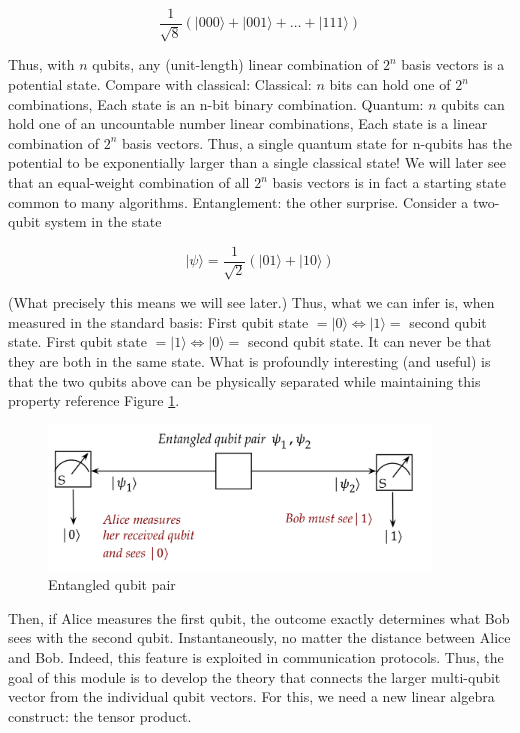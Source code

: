 \documentclass[main.tex]{subfiles}
\begin{document}
    $$
    \frac{1}{\sqrt{8}}(|000\rangle+|001\rangle+\ldots+|111\rangle)
    $$
    
    Thus, with $n$ qubits, any (unit-length) linear combination of $2^{n}$ basis vectors is a potential state. Compare with classical: Classical: $n$ bits can hold one of $2^{n}$ combinations, Each state is an $\mathrm{n}$-bit binary combination. Quantum: $n$ qubits can hold one of an uncountable number linear combinations, Each state is a linear combination of $2^{n}$ basis vectors. Thus, a single quantum state for n-qubits has the potential to be exponentially larger than a single classical state! We will later see that an equal-weight combination of all $2^{n}$ basis vectors is in fact a starting state common to many algorithms.
    Entanglement: the other surprise. Consider a two-qubit system in the state
    
    $$
    |\psi\rangle=\frac{1}{\sqrt{2}}(|01\rangle+|10\rangle)
    $$
    
    (What precisely this means we will see later.) Thus, what we can infer is, when measured in the standard basis: First qubit state $=|0\rangle \Longleftrightarrow|1\rangle=$ second qubit state. First qubit state $=|1\rangle \Longleftrightarrow|0\rangle=$ second qubit state. It can never be that they are both in the same state. What is profoundly interesting (and useful) is that the two qubits above can be physically separated while maintaining this property reference Figure \ref{fig:04bits3}.
    
    \begin{figure}
        \centering
        \includegraphics[width=4in]{notes/figs/n06/04bits3.png}
        \caption{Entangled qubit pair}
        \label{fig:04bits3}
    \end{figure} 
    
    Then, if Alice measures the first qubit, the outcome exactly determines what Bob sees with the second qubit. Instantaneously, no matter the distance between Alice and Bob. Indeed, this feature is exploited in communication protocols. Thus, the goal of this module is to develop the theory that connects the larger multi-qubit vector from the individual qubit vectors. For this, we need a new linear algebra construct: the tensor product.
\end{document}
